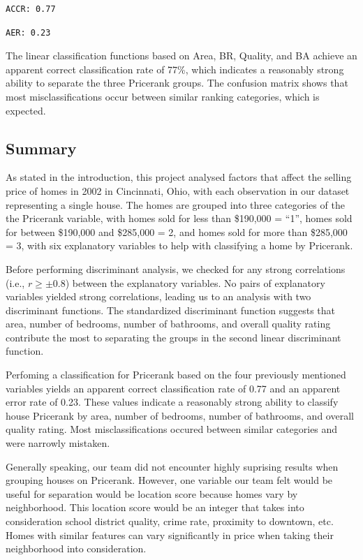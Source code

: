 \documentclass[
  letterpaper,
  DIV=11,
  numbers=noendperiod]{scrartcl}
\begin{document}
\begin{verbatim}
ACCR: 0.77 
\end{verbatim}

\begin{verbatim}
AER: 0.23 
\end{verbatim}

The linear classification functions based on Area, BR, Quality, and BA
achieve an apparent correct classification rate of 77\%, which indicates
a reasonably strong ability to separate the three Pricerank groups. The
confusion matrix shows that most misclassifications occur between
similar ranking categories, which is expected.

\hypertarget{summary}{%
\subsection{Summary}\label{summary}}

As stated in the introduction, this project analysed factors that affect
the selling price of homes in 2002 in Cincinnati, Ohio, with each
observation in our dataset representing a single house. The homes are
grouped into three categories of the the Pricerank variable, with homes
sold for less than \$190,000 = ``1'', homes sold for between \$190,000
and \$285,000 = 2, and homes sold for more than \$285,000 = 3, with six
explanatory variables to help with classifying a home by Pricerank.

Before performing discriminant analysis, we checked for any strong
correlations (i.e., \(r \ge \pm 0.8\)) between the explanatory
variables. No pairs of explanatory variables yielded strong
correlations, leading us to an analysis with two discriminant functions.
The standardized discriminant function suggests that area, number of
bedrooms, number of bathrooms, and overall quality rating contribute the
most to separating the groups in the second linear discriminant
function.

Perfoming a classification for Pricerank based on the four previously
mentioned variables yields an apparent correct classification rate of
0.77 and an apparent error rate of 0.23. These values indicate a
reasonably strong ability to classify house Pricerank by area, number of
bedrooms, number of bathrooms, and overall quality rating. Most
misclassifications occured between similar categories and were narrowly
mistaken.

Generally speaking, our team did not encounter highly suprising results
when grouping houses on Pricerank. However, one variable our team felt
would be useful for separation would be location score because homes
vary by neighborhood. This location score would be an integer that takes
into consideration school district quality, crime rate, proximity to
downtown, etc. Homes with similar features can vary significantly in
price when taking their neighborhood into consideration.
\end{document}
